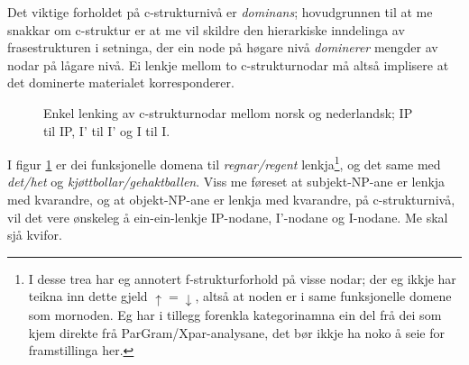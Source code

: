 \documentclass[12pt,a4paper,oneside,draft]{report}
\newcommand{\proj}[2]{\begin{tabular}{c}\footnotesize{#1}\\\normalsize{#2}\end{tabular}}
\newcommand{\ua}{\ensuremath{\uparrow}}
\newcommand{\da}{\ensuremath{\downarrow}}
\begin{document}
Det viktige forholdet på c\hyp{}strukturnivå er \emph{dominans}; hovudgrunnen
til at me snakkar om c\hyp{}struktur er at me vil skildre den hierarkiske
inndelinga av frasestrukturen i setninga, der ein node på høgare nivå
\emph{dominerer} mengder av nodar på lågare nivå. Ei lenkje mellom to
c\hyp{}strukturnodar må altså implisere at det dominerte materialet
korresponderer.


\begin{figure}[htp]
\centering
   \caption{Enkel lenking av c\hyp{}strukturnodar mellom norsk og
   nederlandsk; IP til IP, I' til I' og I til I.}
   \label{fig:enkel-c-lenkje}
  \end{figure}

I figur \ref{fig:enkel-c-lenkje} er dei funksjonelle domena til \emph{regnar/regent} 
lenkja\footnote{I desse trea har eg annotert f\hyp{}strukturforhold på visse nodar;
       der eg ikkje har teikna inn dette gjeld $\ua=\da$, altså at
       noden er i same funksjonelle domene som mornoden. Eg har i
       tillegg forenkla kategorinamna ein del frå dei som kjem direkte
       frå ParGram/Xpar-analysane, det bør ikkje ha noko å seie for
       framstillinga her. }, og det same med \emph{det/het} og \emph{kjøttbollar/gehaktballen}. 
Viss me føreset at subjekt-NP-ane er lenkja med kvarandre, og at
objekt-NP-ane er lenkja med kvarandre, på c\hyp{}strukturnivå,
vil det vere ønskeleg å ein-ein-lenkje IP-nodane, I'-nodane og
I-nodane. Me skal sjå kvifor.
\end{document}
